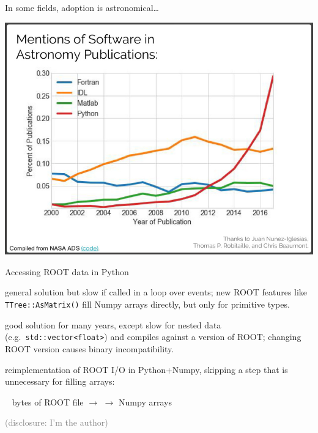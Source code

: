 \documentclass[aspectratio=169]{beamer}
\begin{document}
\begin{frame}{In some fields, adoption is astronomical\ldots}
\vspace{0.25 cm}
\begin{center}
\includegraphics[width=0.7\linewidth]{mentions-of-programming-languages.png}
\end{center}
\end{frame}

\begin{frame}{Accessing ROOT data in Python}
\large
\vspace{0.5 cm}
\renewcommand\CancelColor{\color{red}}
\begin{description}\setlength{\itemsep}{0.5 cm}
\item[PyROOT:] general solution but slow if called in a loop over events; new ROOT features like {\normalsize\tt TTree::AsMatrix()} fill Numpy arrays directly, but only for primitive types.

\item[root\_numpy:]<2-> good solution for many years, except slow for nested data (e.g.~{\normalsize\tt std::vector<float>}) and compiles against a version of ROOT; changing ROOT version causes binary incompatibility.

\item[uproot:]<3-> reimplementation of ROOT I/O in Python+Numpy, skipping a step that is unnecessary for filling arrays:

\vspace{0.35 cm}
\mbox{ } \hfill bytes of ROOT file $\to$  $\to$ Numpy arrays \hfill \mbox{ }

\vspace{0.35 cm}
\textcolor{gray}{(disclosure: I'm the author)}
\end{description}
\end{frame}
\end{document}
